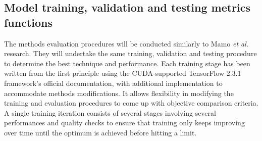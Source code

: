 \subsection{Model training, validation and testing metrics functions} \label{subsec:t_model}
%
The methods evaluation procedures will be conducted similarly to Mamo \textit{et al.}~\cite{mamo_long_2020} research.
They will undertake the same training, validation and testing procedure to determine the best technique and performance.
Each training stage has been written from the first principle using the CUDA-supported TensorFlow 2.3.1 framework's official documentation, with additional implementation to accommodate methods modifications\cite{chollet_writing_2020}.
It allows flexibility in modifying the training and evaluation procedures to come up with objective comparison criteria.
A single training iteration consists of several stages involving several performances and quality checks to ensure that training only keeps improving over time until the optimum is achieved before hitting a limit.

